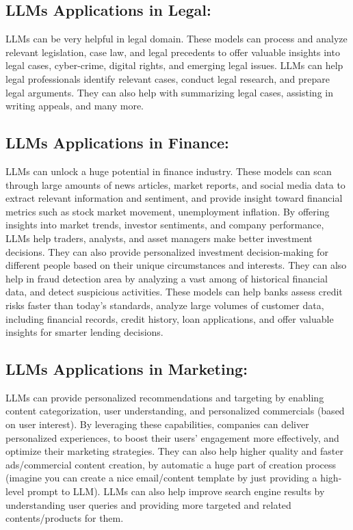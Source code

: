 \documentclass[conference]{IEEEtran}
\begin{document}
\subsection{LLMs Applications in Legal:} 
LLMs can be very helpful in legal domain.
These models can process and analyze relevant legislation, case law, and legal precedents to offer valuable insights into legal cases, cyber-crime, digital rights, and emerging legal issues. LLMs can help legal professionals identify relevant cases, conduct legal research, and prepare legal arguments. They can also help with summarizing legal cases, assisting in writing appeals, and many more.

\subsection{LLMs Applications in Finance:}
LLMs can unlock a huge potential in finance industry.
These models can scan through large amounts of news articles, market reports, and social media data to extract relevant information and sentiment, and provide insight toward financial metrics such as stock market movement, unemployment inflation. By offering insights into market trends, investor sentiments, and company performance, LLMs help traders, analysts, and asset managers make better investment decisions.
They can also provide personalized investment decision-making for different people based on their unique circumstances and interests. 
They can also help in fraud detection area by analyzing a vast among of historical financial data, and detect suspicious activities. 
These models can help banks assess credit risks faster than today's standards, analyze large volumes of customer data, including financial records, credit history, loan applications, and offer valuable insights for smarter lending decisions.

\subsection{LLMs Applications in Marketing:}
LLMs can provide personalized recommendations and targeting by enabling content categorization, user understanding, and personalized commercials (based on user interest). 
By leveraging these capabilities, companies can deliver personalized experiences, to boost their users' engagement more effectively, and optimize their marketing strategies.
They can also help higher quality and faster ads/commercial content creation, by automatic a huge part of creation process (imagine you can create a nice email/content template by just providing a high-level prompt to LLM).
LLMs can also help improve search engine results by understanding user queries and providing more targeted and related contents/products for them.
\end{document}
